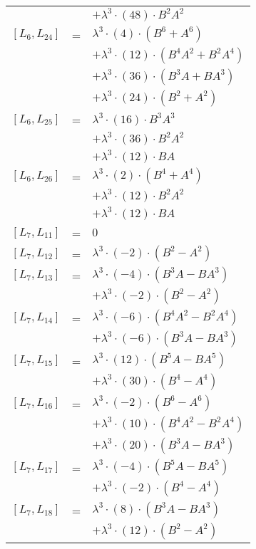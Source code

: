 \documentclass{article}
\begin{document}
\begin{center}
\begin{longtable}{lll}
 & & $ + {\lambda}^3{\cdot}(48){\cdot}B^{2}A^{2}$ \\
$[L_{6},L_{24}]$ & = & ${\lambda}^3{\cdot}(4){\cdot}(B^{6}+A^{6})$ \\*
 & & $ + {\lambda}^3{\cdot}(12){\cdot}(B^{4}A^{2}+B^{2}A^{4})$ \\*
 & & $ + {\lambda}^3{\cdot}(36){\cdot}(B^{3}A+BA^{3})$ \\*
 & & $ + {\lambda}^3{\cdot}(24){\cdot}(B^{2}+A^{2})$ \\
$[L_{6},L_{25}]$ & = & ${\lambda}^3{\cdot}(16){\cdot}B^{3}A^{3}$ \\*
 & & $ + {\lambda}^3{\cdot}(36){\cdot}B^{2}A^{2}$ \\*
 & & $ + {\lambda}^3{\cdot}(12){\cdot}BA$ \\
$[L_{6},L_{26}]$ & = & ${\lambda}^3{\cdot}(2){\cdot}(B^{4}+A^{4})$ \\*
 & & $ + {\lambda}^3{\cdot}(12){\cdot}B^{2}A^{2}$ \\*
 & & $ + {\lambda}^3{\cdot}(12){\cdot}BA$ \\
$[L_{7},L_{11}]$ & = & $ 0 $ \\
$[L_{7},L_{12}]$ & = & ${\lambda}^3{\cdot}(-2){\cdot}(B^{2}-A^{2})$ \\
$[L_{7},L_{13}]$ & = & ${\lambda}^3{\cdot}(-4){\cdot}(B^{3}A-BA^{3})$ \\*
 & & $ + {\lambda}^3{\cdot}(-2){\cdot}(B^{2}-A^{2})$ \\
$[L_{7},L_{14}]$ & = & ${\lambda}^3{\cdot}(-6){\cdot}(B^{4}A^{2}-B^{2}A^{4})$ \\*
 & & $ + {\lambda}^3{\cdot}(-6){\cdot}(B^{3}A-BA^{3})$ \\
$[L_{7},L_{15}]$ & = & ${\lambda}^3{\cdot}(12){\cdot}(B^{5}A-BA^{5})$ \\*
 & & $ + {\lambda}^3{\cdot}(30){\cdot}(B^{4}-A^{4})$ \\
$[L_{7},L_{16}]$ & = & ${\lambda}^3{\cdot}(-2){\cdot}(B^{6}-A^{6})$ \\*
 & & $ + {\lambda}^3{\cdot}(10){\cdot}(B^{4}A^{2}-B^{2}A^{4})$ \\*
 & & $ + {\lambda}^3{\cdot}(20){\cdot}(B^{3}A-BA^{3})$ \\
$[L_{7},L_{17}]$ & = & ${\lambda}^3{\cdot}(-4){\cdot}(B^{5}A-BA^{5})$ \\*
 & & $ + {\lambda}^3{\cdot}(-2){\cdot}(B^{4}-A^{4})$ \\
$[L_{7},L_{18}]$ & = & ${\lambda}^3{\cdot}(8){\cdot}(B^{3}A-BA^{3})$ \\*
 & & $ + {\lambda}^3{\cdot}(12){\cdot}(B^{2}-A^{2})$ \\

\end{longtable}
\end{center}
\end{document}
